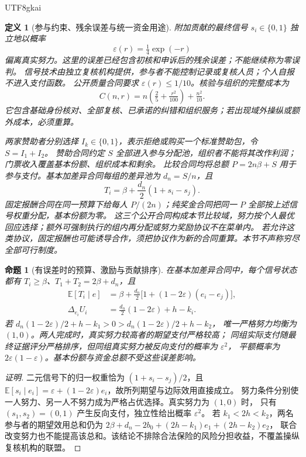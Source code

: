 \documentclass[12pt,a4paper,openany]{report}
\newtheorem{definition}{定义}[chapter]
\newtheorem{proposition}{命题}[chapter]
\newcommand{\EE}{\mathbb E}
\begin{document}
\begin{CJK*}{UTF8}{gkai}
\begin{definition}[参与约束、残余误差与统一资金用途]
附加贡献的最终信号 \(s_i\in\{0,1\}\) 独立地以概率
\[
 \varepsilon(r)=\tfrac14\exp(-r)
\]
偏离真实努力。这里的误差已经包含初核和申诉后的残余误差；不能继续称为零误判。
信号技术由独立复核机构提供，参与者不能控制记录或复核人员；个人自报不进入支付函数。
公开质量合同要求 \(\varepsilon(r)\le1/10\)。核验与组织的完整成本为
\[
 C(n,r)=n\left(\tfrac25+\tfrac{r^2}{100}\right)+\tfrac{n^2}{10}.
\]
它包含基础身份核对、全部复核、已承诺的纠错和组织服务；若出现域外操纵或额外成本，必须重算。

两家赞助者分别选择 \(I_k\in\{0,1\}\)，表示拒绝或购买一个标准赞助包，令 \(S=I_1+I_2\)。
赞助合同约定 \(S\) 全部进入参与分配池，组织者不能将其改作利润；门票收入覆盖基本份额、组织成本和剩余。
比较合同均将总额 \(P=2n\beta+S\) 用于参与支付。基本加差异合同每组的差异池为 \(d_n=S/n\)，且
\[
 T_i=\beta+\frac{d_n}{2}(1+s_i-s_j).
\]
固定报酬合同在同一预算下给每人 \(P/(2n)\)；纯奖金合同把同一 \(P\) 全部按上述信号权重分配，基本份额为零。
这三个公开合同构成本节比较域，努力按个人最优回应选择；额外可强制执行的组内再分配或努力奖励协议不在菜单内。
若允许这类协议，固定报酬也可能诱导合作，须把协议作为新的合同重算。本节不声称穷尽全部可行制度。
\end{definition}

\begin{proposition}[有误差时的预算、激励与贡献排序]
\label{prop:noisy-effort-contract}
在基本加差异合同中，每个信号状态都有
\(T_i\ge\beta\)、\(T_1+T_2=2\beta+d_n\)，且
\[
 \begin{aligned}
 \EE[T_i\mid e]&=\beta+\frac{d_n}{2}
       \bigl[1+(1-2\varepsilon)(e_i-e_j)\bigr],\\
 \Delta_{e_i}U_i&=\frac{d_n}{2}(1-2\varepsilon)+h-k_i.
 \end{aligned}
\]
若 \(d_n(1-2\varepsilon)/2+h-k_1>0>d_n(1-2\varepsilon)/2+h-k_2\)，
唯一严格努力均衡为 \((1,0)\)。两人完成时，真实努力较高者的期望支付严格较高；
同组实际支付随最终证据评分严格排序，但同组真实努力被反向支付的概率为 \(\varepsilon^2\)，
平额概率为 \(2\varepsilon(1-\varepsilon)\)。基本份额与资金总额不受这些误差影响。
\end{proposition}

\begin{proof}[证明]
二元信号下的归一权重恰为 \((1+s_i-s_j)/2\)，且
\(\EE[s_i\mid e_i]=\varepsilon+(1-2\varepsilon)e_i\)，故所列期望与边际效用直接成立。
努力条件分别使一人努力、另一人不努力成为严格占优选择。真实努力为 \((1,0)\) 时，
只有 \((s_1,s_2)=(0,1)\) 产生反向支付，独立性给出概率 \(\varepsilon^2\)。
若 \(k_1<2h<k_2\)，两名参与者的期望效用总和仍为
\(2\beta+d_n-2b_0+(2h-k_1)e_1+(2h-k_2)e_2\)，
联合改变努力也不能提高该总和。该结论不排除合法保险的风险分担收益，不覆盖操纵复核机构的联盟。
\end{proof}


\end{CJK*}
\end{document}
